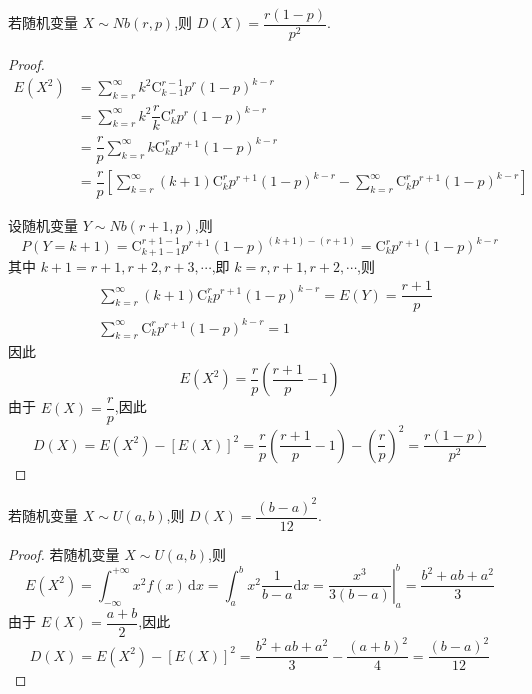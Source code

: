 \begin{conclusion}
    \indent 若随机变量 $X \sim Nb(r,p)$,则 $D(X) = \dfrac{r(1-p)}{p^2}$.
\end{conclusion}

\begin{proof}
    $$
    \begin{aligned}
        E(X^2) &= \sum_{k=r}^{\infty} k^2 \mathrm{C}_{k-1}^{r-1} p^r (1-p)^{k-r} \\
        &= \sum_{k=r}^{\infty} k^2 \dfrac{r}{k} \mathrm{C}_{k}^{r} p^r (1-p)^{k-r} \\
        &= \dfrac{r}{p} \sum_{k=r}^{\infty} k \mathrm{C}_{k}^{r} p^{r+1} (1-p)^{k-r} \\
        &= \dfrac{r}{p} \left[ \sum_{k=r}^{\infty} (k+1) \mathrm{C}_{k}^{r} p^{r+1} (1-p)^{k-r} - \sum_{k=r}^{\infty} \mathrm{C}_{k}^{r} p^{r+1} (1-p)^{k-r} \right]
    \end{aligned}
    $$

    设随机变量 $Y \sim Nb(r+1,p)$,则
    $$
    P(Y=k+1) = \mathrm{C}_{k+1-1}^{r+1-1} p^{r+1} (1-p)^{(k+1)-(r+1)} = \mathrm{C}_{k}^{r} p^{r+1} (1-p)^{k-r}
    $$
    其中 $k+1 = r+1, r+2, r+3, \cdots$,即 $k = r, r+1, r+2, \cdots$,则
    $$
    \begin{aligned}
        & \sum_{k=r}^{\infty} (k+1) \mathrm{C}_{k}^{r} p^{r+1} (1-p)^{k-r} = E(Y) = \dfrac{r+1}{p} \\
        & \sum_{k=r}^{\infty} \mathrm{C}_{k}^{r} p^{r+1} (1-p)^{k-r} = 1
    \end{aligned}
    $$
    因此
    $$
    E(X^2) = \dfrac{r}{p} \left( \dfrac{r+1}{p} - 1 \right)
    $$
    由于 $E(X) = \dfrac{r}{p}$,因此
    $$
    D(X) = E(X^2) - [E(X)]^2 = \dfrac{r}{p} \left( \dfrac{r+1}{p} - 1 \right) - \left( \dfrac{r}{p} \right)^2 = \dfrac{r(1-p)}{p^2}
    $$
\end{proof}

\begin{conclusion}
    \indent 若随机变量 $X \sim U(a,b)$,则 $D(X) = \dfrac{(b-a)^2}{12}$.
\end{conclusion}

\begin{proof}
    若随机变量 $X \sim U(a,b)$,则
    $$
    E(X^2) = \int_{-\infty}^{+\infty} x^2 f(x) \, \text{d}x = \int_a^b x^2 \dfrac{1}{b-a} \text{d}x = \left. \dfrac{x^3}{3(b-a)} \right|_a^b = \dfrac{b^2 + ab + a^2}{3}
    $$
    由于 $E(X) = \dfrac{a+b}{2}$,因此
    $$
    D(X) = E(X^2) - [E(X)]^2 = \dfrac{b^2 + ab + a^2}{3} - \dfrac{(a+b)^2}{4} = \dfrac{(b-a)^2}{12}
    $$
\end{proof}

